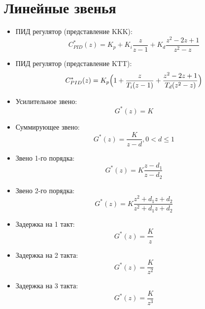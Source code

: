 \documentclass[12pt]{article}
\begin{document}
\section{Линейные звенья}

\begin{itemize}


\item ПИД регулятор (представление KKK):
  $$C_{PID}^*(z)=K_p+K_i\frac{z}{z-1}+K_d\frac{z^2-2z+1}{z^2-z}$$

\item ПИД регулятор (представление KTT):
  $$C_{PID}^*(z)=K_p\Bigl(1+\frac{z}{T_i(z-1)}+\frac{z^2-2z+1}{T_d(z^2-z)}\Bigr)$$

\item Усилительное звено:
$$G^*(z)=K$$

\item Суммирующее звено:
$$G^*(z)=\frac{K}{z-d}, 0<d\le 1$$

\item Звено 1-го порядка:
$$G^*(z)=K\frac{z-d_1}{z-d_2}$$

\item Звено 2-го порядка:
$$G^*(z)=K\frac{z^2+d_1z+d_2}{z^2+d_1z+d_2}$$

\item Задержка на 1 такт:
$$G^*(z)=\frac{K}{z}$$

\item Задержка на 2 такта:
$$G^*(z)=\frac{K}{z^2}$$

\item Задержка на 3 такта:
$$G^*(z)=\frac{K}{z^3}$$


\end{itemize}
\end{document}
